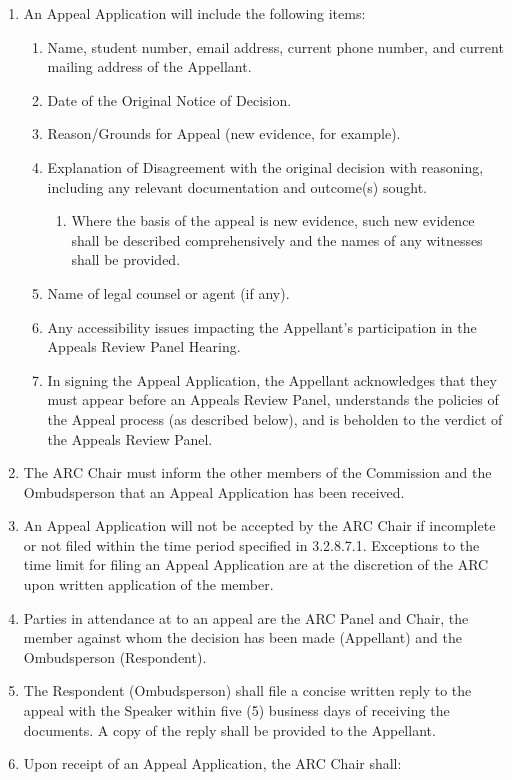 \begin{enumerate} [align=left]
\begin{enumerate} [label*=\arabic*., align=left]
\item An Appeal Application will include the following items:
\begin{enumerate} [label*=\arabic*., align=left]
\item Name, student number, email address, current phone number, and current mailing address of the Appellant.
\item Date of the Original Notice of Decision.
\item Reason/Grounds for Appeal (new evidence, for example).
\item Explanation of Disagreement with the original decision with reasoning, including any relevant documentation and outcome(s) sought.
\begin{enumerate} [label*=\arabic*., align=left]
\item Where the basis of the appeal is new evidence, such new evidence shall be described comprehensively and the names of any witnesses shall be provided.
\end{enumerate}
\item Name of legal counsel or agent (if any).
\item Any accessibility issues impacting the Appellant’s participation in the Appeals Review Panel Hearing.
\item In signing the Appeal Application, the Appellant acknowledges that they must appear before an Appeals Review Panel, understands the policies of the Appeal process (as described below), and is beholden to the verdict of the Appeals Review Panel.
\end{enumerate}
\item The ARC Chair must inform the other members of the Commission and the Ombudsperson that an Appeal Application has been received.
\item An Appeal Application will not be accepted by the ARC Chair if incomplete or not filed within the time period specified in 3.2.8.7.1. Exceptions to the time limit for filing an Appeal Application are at the discretion of the ARC upon written application of the member.
\item Parties in attendance at to an appeal are the ARC Panel and Chair, the member against whom the decision has been made (Appellant) and the Ombudsperson (Respondent). 
\item The Respondent (Ombudsperson) shall file a concise written reply to the appeal with the Speaker within five (5) business days of receiving the documents. A copy of the reply shall be provided to the Appellant.
\item Upon receipt of an Appeal Application, the ARC Chair shall:

\end{enumerate}
\end{enumerate}
